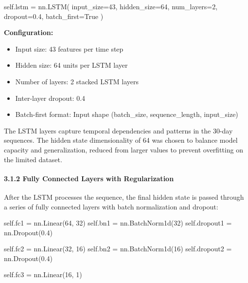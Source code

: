\documentclass[
]{article}
\newenvironment{Shaded}{}{}
\newcommand{\DecValTok}[1]{\textcolor[rgb]{0.25,0.63,0.44}{#1}}
\newcommand{\FloatTok}[1]{\textcolor[rgb]{0.25,0.63,0.44}{#1}}
\newcommand{\NormalTok}[1]{#1}
\newcommand{\OperatorTok}[1]{\textcolor[rgb]{0.40,0.40,0.40}{#1}}
\newcommand{\VariableTok}[1]{\textcolor[rgb]{0.10,0.09,0.49}{#1}}
\begin{document}
\begin{Shaded}
\begin{Highlighting}[]
\VariableTok{self}\NormalTok{.lstm }\OperatorTok{=}\NormalTok{ nn.LSTM(}
\NormalTok{    input\_size}\OperatorTok{=}\DecValTok{43}\NormalTok{,}
\NormalTok{    hidden\_size}\OperatorTok{=}\DecValTok{64}\NormalTok{,}
\NormalTok{    num\_layers}\OperatorTok{=}\DecValTok{2}\NormalTok{,}
\NormalTok{    dropout}\OperatorTok{=}\FloatTok{0.4}\NormalTok{,}
\NormalTok{    batch\_first}\OperatorTok{=}\VariableTok{True}
\NormalTok{)}
\end{Highlighting}
\end{Shaded}

\textbf{Configuration:}

\begin{itemize}
\item
  Input size: 43 features per time step
\item
  Hidden size: 64 units per LSTM layer
\item
  Number of layers: 2 stacked LSTM layers
\item
  Inter-layer dropout: 0.4
\item
  Batch-first format: Input shape (batch\_size, sequence\_length,
  input\_size)
\end{itemize}

The LSTM layers capture temporal dependencies and patterns in the 30-day
sequences. The hidden state dimensionality of 64 was chosen to balance
model capacity and generalization, reduced from larger values to prevent
overfitting on the limited dataset.

\paragraph{3.1.2 Fully Connected Layers with
Regularization}\label{312-fully-connected-layers-with-regularization}

After the LSTM processes the sequence, the final hidden state is passed
through a series of fully connected layers with batch normalization and
dropout:

\begin{Shaded}
\begin{Highlighting}[]
\VariableTok{self}\NormalTok{.fc1 }\OperatorTok{=}\NormalTok{ nn.Linear(}\DecValTok{64}\NormalTok{, }\DecValTok{32}\NormalTok{)}
\VariableTok{self}\NormalTok{.bn1 }\OperatorTok{=}\NormalTok{ nn.BatchNorm1d(}\DecValTok{32}\NormalTok{)}
\VariableTok{self}\NormalTok{.dropout1 }\OperatorTok{=}\NormalTok{ nn.Dropout(}\FloatTok{0.4}\NormalTok{)}

\VariableTok{self}\NormalTok{.fc2 }\OperatorTok{=}\NormalTok{ nn.Linear(}\DecValTok{32}\NormalTok{, }\DecValTok{16}\NormalTok{)}
\VariableTok{self}\NormalTok{.bn2 }\OperatorTok{=}\NormalTok{ nn.BatchNorm1d(}\DecValTok{16}\NormalTok{)}
\VariableTok{self}\NormalTok{.dropout2 }\OperatorTok{=}\NormalTok{ nn.Dropout(}\FloatTok{0.4}\NormalTok{)}

\VariableTok{self}\NormalTok{.fc3 }\OperatorTok{=}\NormalTok{ nn.Linear(}\DecValTok{16}\NormalTok{, }\DecValTok{1}\NormalTok{)}
\end{Highlighting}
\end{Shaded}
\end{document}
